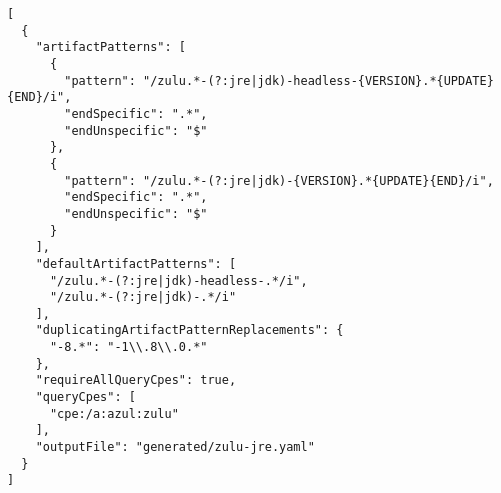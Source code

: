 \begin{lstlisting}[style=json,caption={Korrelationsgeneratordatei im Generatorformat für Zulu JRE/JDK},label={lst:correlation-generator-format-cpe-jre-jdk},basicstyle=\ttfamily\scriptsize]
[
  {
    "artifactPatterns": [
      {
        "pattern": "/zulu.*-(?:jre|jdk)-headless-{VERSION}.*{UPDATE}{END}/i",
        "endSpecific": ".*",
        "endUnspecific": "$"
      },
      {
        "pattern": "/zulu.*-(?:jre|jdk)-{VERSION}.*{UPDATE}{END}/i",
        "endSpecific": ".*",
        "endUnspecific": "$"
      }
    ],
    "defaultArtifactPatterns": [
      "/zulu.*-(?:jre|jdk)-headless-.*/i",
      "/zulu.*-(?:jre|jdk)-.*/i"
    ],
    "duplicatingArtifactPatternReplacements": {
      "-8.*": "-1\\.8\\.0.*"
    },
    "requireAllQueryCpes": true,
    "queryCpes": [
      "cpe:/a:azul:zulu"
    ],
    "outputFile": "generated/zulu-jre.yaml"
  }
]
\end{lstlisting}
